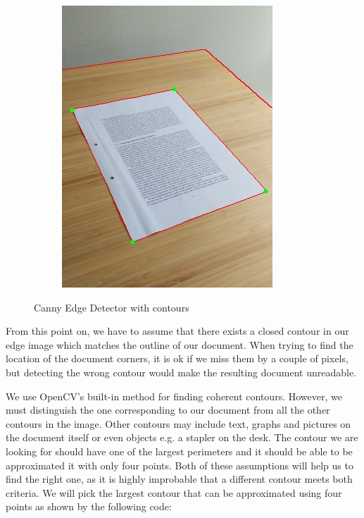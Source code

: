 \documentclass[bibliography=totoc]{scrartcl}
\begin{document}
\begin{figure}[h!]
\begin{subfigure}[b]{0.3\linewidth}
		\includegraphics[width=\linewidth]{imgs/contours/extreme_angle.jpg}
	\end{subfigure}
	\caption{Canny Edge Detector with contours}
	\label{fig:contours}
\end{figure}

From this point on, we have to assume that there exists a closed contour in our edge image which matches the outline of our document.
When trying to find the location of the document corners, it is ok if we miss them by a couple of pixels, but detecting the wrong contour would make the resulting document unreadable.

We use OpenCV's built-in method for finding coherent contours.
However, we must distinguish the one corresponding to our document from all the other contours in the image.
Other contours may include text, graphs and pictures on the document itself or even objects e.g. a stapler on the desk.
The contour we are looking for should have one of the largest perimeters and it should be able to be approximated it with only four points.
Both of these assumptions will help us to find the right one, as it is highly improbable that a different contour meets both criteria.
We will pick the largest contour that can be approximated using four points as shown by the following code: \\
\end{document}
